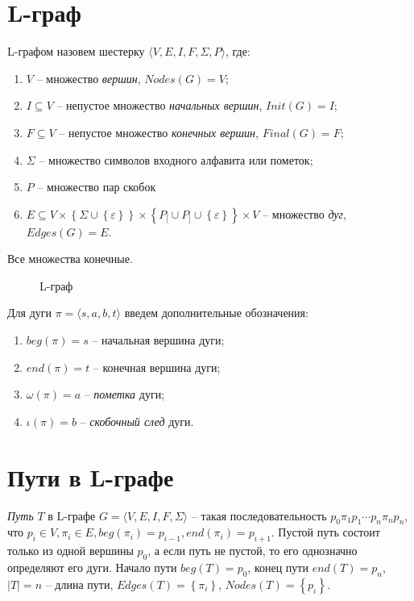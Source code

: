 \section{L-граф}
L-графом назовем шестерку $\langle V,E,I,F,\Sigma,P\rangle$, где:
\begin{enumerate}[label=\arabic*)]
    \item $V$ -- множество \emph{вершин}, $Nodes(G) = V$;
    \item $I \subseteq V$ -- непустое множество \emph{начальных вершин}, $Init(G) = I$;
    \item $F \subseteq V$ -- непустое множество \emph{конечных вершин}, $Final(G) = F$;
    \item $\Sigma$ -- множество символов входного алфавита или пометок;
    \item $P$ -- множество пар скобок
    \item $E \subseteq V 
                    \times \left\{ \Sigma \cup \left\{ \varepsilon \right\}\right\} 
                    \times \left\{ P_[ \cup P_] \cup \left\{ \varepsilon \right\} \right\} 
                    \times V $
        -- множество \emph{дуг}, $Edges(G) = E$.
\end{enumerate}
Все множества конечные.

\begin{figure}
    \centering
    
    \caption{L-граф}
    \label{lgraph1-expample-image}
    
\end{figure}

Для дуги $\pi = \langle s, a, b, t \rangle$ введем дополнительные обозначения:
\begin{enumerate}[label=\arabic*)]
    \item $beg(\pi) = s$ -- начальная вершина дуги;
    \item $end(\pi) = t$ -- конечная вершина дуги;
    \item $\omega(\pi) = a$ -- \emph{пометка} дуги;
    \item $\iota(\pi) = b$ -- \emph{скобочный след} дуги.
\end{enumerate}

\section{Пути в L-графе}
\emph{Путь} $T$ в L-графе $G=\langle V,E,I,F,\Sigma\rangle$ -- такая последовательность $p_0 \pi_1 p_1 \cdots p_n \pi_n p_n$, что 
$p_i \in V, \pi_i \in E, beg(\pi_i) = p_{i-1}, end(\pi_i) = p_{i+1}$.
Пустой путь состоит только из одной вершины $p_0$, а если путь не пустой, то его однозначно определяют его дуги.
Начало пути $beg(T) = p_0$, конец пути $end(T) = p_n$, $\left| T \right| = n$ -- длина пути, 
$Edges(T) = \left\{ \pi_i \right\}$, $Nodes(T) = \left\{ p_i \right\}$.

